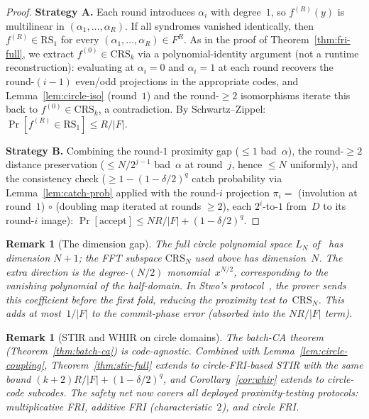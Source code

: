 \documentclass[11pt]{article}
\newtheorem{remark}[theorem]{Remark}
\newcommand{\RS}{\mathrm{RS}}
\begin{document}
\begin{proof}
\textbf{Strategy A.} Each round introduces $\alpha_i$ with degree~$1$, so $f^{(R)}(y)$ is multilinear in $(\alpha_1, \ldots, \alpha_R)$. If all syndromes vanished identically, then $f^{(R)} \in \RS_1$ for every $(\alpha_1, \ldots, \alpha_R) \in F^R$. As in the proof of Theorem~\ref{thm:fri-full}, we extract $f^{(0)} \in \mathrm{CRS}_k$ via a polynomial-identity argument (not a runtime reconstruction): evaluating at $\alpha_i = 0$ and $\alpha_i = 1$ at each round recovers the round-$(i{-}1)$ even/odd projections in the appropriate codes, and Lemma~\ref{lem:circle-iso} (round~$1$) and the round-$\geq 2$ isomorphisms iterate this back to $f^{(0)} \in \mathrm{CRS}_k$, a contradiction. By Schwartz--Zippel: $\Pr[f^{(R)} \in \RS_1] \leq R/|F|$.

\textbf{Strategy B.} Combining the round-$1$ proximity gap ($\leq 1$ bad~$\alpha$), the round-$\geq 2$ distance preservation ($\leq N/2^{j-1}$ bad~$\alpha$ at round~$j$, hence $\leq N$ uniformly), and the consistency check ($\geq 1 - (1{-}\delta/2)^q$ catch probability via Lemma~\ref{lem:catch-prob} applied with the round-$i$ projection $\pi_i = $ (involution at round~$1$) $\circ$ (doubling map iterated at rounds $\geq 2$), each $2^i$-to-$1$ from~$D$ to its round-$i$ image): $\Pr[\text{accept}] \leq NR/|F| + (1-\delta/2)^q$.
\end{proof}

\begin{remark}[The dimension gap]
\label{rem:circle-dimgap}
The full circle polynomial space $L_N$ of~\cite{CircleSTARKs} has dimension $N{+}1$; the FFT subspace $\mathrm{CRS}_N$ used above has dimension~$N$. The extra direction is the degree-$(N/2)$ monomial~$x^{N/2}$, corresponding to the vanishing polynomial of the half-domain. In Stwo's protocol~\cite{StwoWhitepaper}, the prover sends this coefficient before the first fold, reducing the proximity test to~$\mathrm{CRS}_N$. This adds at most~$1/|F|$ to the commit-phase error (absorbed into the $NR/|F|$ term).
\end{remark}

\begin{remark}[STIR and WHIR on circle domains]
\label{rem:circle-stir}
The batch-CA theorem (Theorem~\ref{thm:batch-ca}) is code-agnostic. Combined with Lemma~\ref{lem:circle-coupling}, Theorem~\ref{thm:stir-full} extends to circle-FRI-based STIR with the same bound $(k{+}2)R/|F| + (1{-}\delta/2)^q$, and Corollary~\ref{cor:whir} extends to circle-code subcodes. The safety net now covers all deployed proximity-testing protocols: multiplicative FRI, additive FRI (characteristic~$2$), and circle FRI.
\end{remark}
\end{document}
